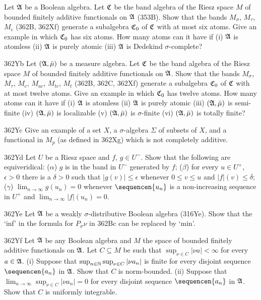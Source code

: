 {
Let $\frak A$ be a Boolean algebra.
Let $\frak C$ be the band algebra of the Riesz space $M$ of bounded
finitely additive functionals on $\frak A$ (353B).   Show that the
bands $M_{\sigma}$, $M_{\tau}$, $M_c$ (362B, 362Xf)  generate a
subalgebra $\frak C_0$ of $\frak C$ with at most six atoms.   Give an
example in which $\frak C_0$ has six atoms.   How many atoms can it have
if (i) $\frak A$ is atomless (ii) $\frak A$ is purely atomic (iii)
$\frak A$ is Dedekind $\sigma$-complete?

\spheader 362Yb Let $(\frak A,\bar\mu)$ be a measure algebra.   Let
$\frak C$ be the band algebra of the Riesz space $M$ of bounded
finitely additive functionals on $\frak A$.   Show that the bands
$M_{\sigma}$, $M_{\tau}$, $M_c$, $M_{ac}$, $M_{tc}$, $M_t$ (362B, 362C,
362Xf)  generate a subalgebra $\frak C_0$ of $\frak C$ with at
most twelve atoms.   Give an example in which $\frak C_0$ has twelve
atoms.   How many atoms can it have if (i) $\frak A$ is atomless (ii)
$\frak A$ is purely atomic (iii) $(\frak A,\bar\mu)$ is semi-finite (iv)
$(\frak A,\bar\mu)$ is localizable (v) $(\frak A,\bar\mu)$ is
$\sigma$-finite (vi) $(\frak A,\bar\mu)$ is totally finite?

\spheader 362Yc Give an example of a set $X$, a $\sigma$-algebra
$\Sigma$ of subsets of $X$, and a functional in $M_p$ (as defined in
362Xg) which is not completely additive.

\spheader 362Yd Let $U$ be a Riesz space and $f$, $g\in U^{\sim}$.
Show that the following are equiveridical:  ($\alpha$) $g$ is in the
band in $U^{\sim}$ generated by $f$;  ($\beta$) for every $u\in U^+$,
$\epsilon>0$ there is a $\delta>0$ such that $|g(v)|\le\epsilon$
whenever $0\le v\le u$ and $|f|(v)\le\delta$;   ($\gamma$)
$\lim_{n\to\infty}g(u_n)=0$ whenever $\sequencen{u_n}$ is a
non-increasing sequence in $U^+$ and $\lim_{n\to\infty}|f|(u_n)=0$.

\spheader 362Ye Let $\frak A$ be a weakly $\sigma$-distributive Boolean
algebra (316Ye).   Show that the `inf' in the formula for
$P_{\sigma}\nu$ in 362Bc can be replaced by `min'.

\spheader 362Yf Let $\frak A$ be any Boolean algebra and $M$ the space
of bounded finitely additive functionals on $\frak A$.   Let
$C\subseteq M$ be such that $\sup_{\nu\in C}|\nu a|<\infty$ for every
$a\in\frak A$.
(i) Suppose that $\sup_{n\in\Bbb N}\sup_{\nu\in C}|\nu a_n|$ is finite
for every disjoint sequence $\sequencen{a_n}$ in $\frak A$.   Show that
$C$ is norm-bounded.   (ii) Suppose that
$\lim_{n\to\infty}\sup_{\nu\in C}|\nu a_n|=0$ for every disjoint
sequence $\sequencen{a_n}$ in $\frak A$.   Show that $C$ is uniformly
integrable.

}
